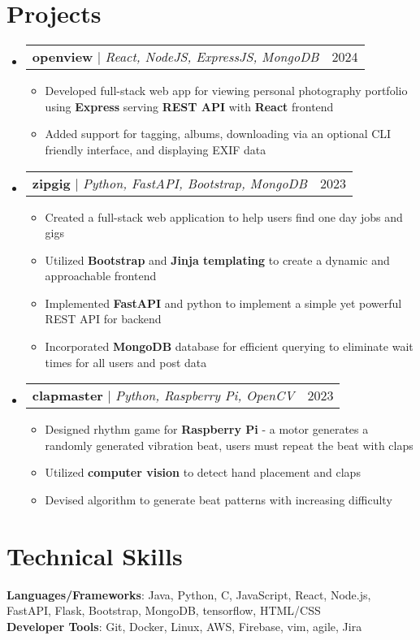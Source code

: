 \documentclass[letterpaper,10pt]{article}
\makeatletter
\newcommand{\resumeItem}[1]{
  \item\small{
    {#1 \vspace{-2pt}}
  }
}
\newcommand{\resumeProjectHeading}[2]{
    \item
    \begin{tabular*}{0.97\textwidth}{l@{\extracolsep{\fill}}r}
      \small#1 & #2 \\
    \end{tabular*}\vspace{-7pt}
}
\newcommand{\resumeSubHeadingListStart}{\begin{itemize}[leftmargin=0.15in, label={}]}
\newcommand{\resumeSubHeadingListEnd}{\end{itemize}}
\newcommand{\resumeItemListStart}{\begin{itemize}}
\newcommand{\resumeItemListEnd}{\end{itemize}\vspace{-5pt}}
\makeatother
\begin{document}
\section{Projects}
    \resumeSubHeadingListStart
      \resumeProjectHeading
          {\textbf{openview} $|$ \emph{React, NodeJS, ExpressJS, MongoDB}}{2024}
          \resumeItemListStart
          \resumeItem{Developed full-stack web app for viewing personal photography portfolio using \textbf{Express} serving \textbf{REST API} with \textbf{React} frontend}
            \resumeItem{Added support for tagging, albums, downloading via an optional CLI friendly interface, and displaying EXIF data}
          \resumeItemListEnd
      \resumeProjectHeading
          {\textbf{zipgig} $|$ \emph{Python, FastAPI, Bootstrap, MongoDB}}{2023}
          \resumeItemListStart
            \resumeItem{Created a full-stack web application to help users find one day jobs and gigs}
            \resumeItem{Utilized \textbf{Bootstrap} and \textbf{Jinja templating} to create a dynamic and approachable frontend}
            \resumeItem{Implemented \textbf{FastAPI} and python to implement a simple yet powerful REST API for backend} 
            \resumeItem{Incorporated \textbf{MongoDB} database for efficient querying to eliminate wait times for all users and post data}
          \resumeItemListEnd
      \resumeProjectHeading
          {\textbf{clapmaster} $|$ \emph{Python, Raspberry Pi, OpenCV}}{2023}
          \resumeItemListStart
          \resumeItem{Designed rhythm game for \textbf{Raspberry Pi} - a motor generates a randomly generated vibration beat, users must repeat the beat with claps}
            \resumeItem{Utilized \textbf{computer vision} to detect hand placement and claps}
            \resumeItem{Devised algorithm to generate beat patterns with increasing difficulty} 
          \resumeItemListEnd
    \resumeSubHeadingListEnd



\section{Technical Skills}
 \begin{itemize}[leftmargin=0.15in, label={}]
    \small{\item{
     \textbf{Languages/Frameworks}{: Java, Python, C, JavaScript, React, Node.js, FastAPI, Flask, Bootstrap, MongoDB, tensorflow, HTML/CSS} \\
     \textbf{Developer Tools}{: Git, Docker, Linux, AWS, Firebase, vim, agile, Jira} \\
    }}

 \end{itemize}
\end{document}
